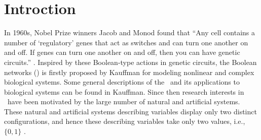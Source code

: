 \section{Introction}
\label{sec:intro}
In 1960s, Nobel Prize winners Jacob and Monod found that  ``Any cell contains a number of `regulatory' genes that act as switches and can turn one another on and off. If genes can turn one another on and off, then you can have genetic circuits.'' \cite{Waldrop1992Complexity,cheng2009controllability}. Inspired by these Boolean-type actions in genetic circuits, the Boolean networks (\BNs) is firstly proposed by Kauffman \cite{Kauffman1968Metabolic} for modeling nonlinear and complex biological systems. Some general descriptions of the \BNs\ and its applications to biological systems can be found in Kauffman. Since then research interests in  \BNs\ have been motivated by the large number of natural and artificial systems. These natural and artificial systems describing variables display only two distinct configurations, and hence these describing variables take only two values, i.e., $\{0,1\}$  \cite{Akutsu2000Inferring, Shmulevich2002From, Faur2006Dynamical,Green2007The,Lou2010Multi,Fornasini2013Observability}.


